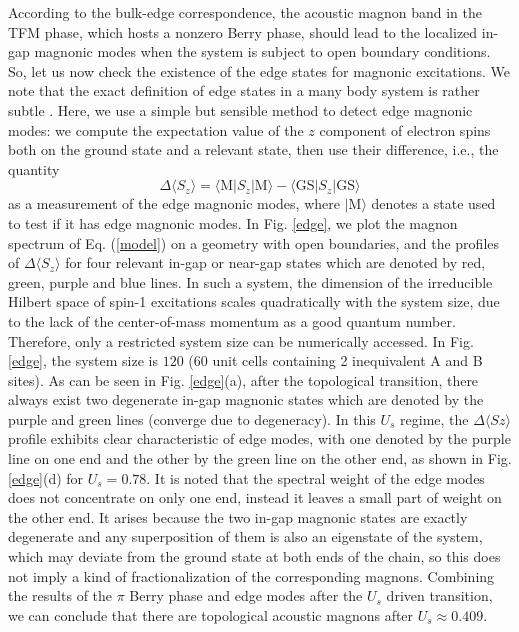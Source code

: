 \documentclass[amsmath,superscriptaddress,showpacs,aps,prb,twocolumn]{revtex4-1}
\begin{document}
\par According to the bulk-edge correspondence, the acoustic magnon band in the TFM phase, which hosts a nonzero Berry phase, should lead to the localized in-gap magnonic modes when the system is subject to open boundary conditions. So, let us now check the existence of the edge states for magnonic excitations. We note that the exact definition of edge states in a many body system is rather subtle \cite{LGLW_NJP2017}. Here, we use a simple but sensible method to detect edge magnonic modes: we compute the expectation value of the $z$ component of electron spins both on the ground state and a relevant state, then use their difference, i.e., the quantity
\begin{equation}
\Delta\langle S_z\rangle=\langle\text{M}|S_z|\text{M}\rangle-\langle\text{GS}|S_z|\text{GS}\rangle
\end{equation}
as a measurement of the edge magnonic modes, where $|\text{M}\rangle$ denotes a state used to test if it has edge magnonic modes. In Fig. \ref{edge}, we plot the magnon spectrum of Eq. (\ref{model}) on a geometry with open boundaries, and the profiles of $\Delta\langle S_z\rangle$ for four relevant in-gap or near-gap states which are denoted by red, green, purple and blue lines. In such a system, the dimension of the irreducible Hilbert space of spin-1 excitations scales quadratically with the system size, due to the lack of the center-of-mass momentum as a good quantum number. Therefore, only a restricted system size can be numerically accessed. In Fig. \ref{edge}, the system size is $120$ ($60$ unit cells containing 2 inequivalent A and B sites). As can be seen in Fig. \ref{edge}(a), after the topological transition, there always exist two degenerate in-gap magnonic states which are denoted by the purple and green lines (converge due to degeneracy). In this $U_s$ regime, the $\Delta\langle Sz\rangle$ profile exhibits clear characteristic of edge modes, with one denoted by the purple line on one end and the other by the green line on the other end, as shown in Fig. \ref{edge}(d) for $U_s=0.78$. It is noted that the spectral weight of the edge modes does not concentrate on only one end, instead it leaves a small part of weight on the other end. It arises because the two in-gap magnonic states are exactly degenerate and any superposition of them is also an eigenstate of the system, which may deviate from the ground state at both ends of the chain, so this does not imply a kind of fractionalization of the corresponding magnons. Combining the results of the $\pi$ Berry phase and edge modes after the $U_{s}$ driven transition, we can conclude that there are topological acoustic magnons after $U_{s}\approx 0.409$.
\end{document}
